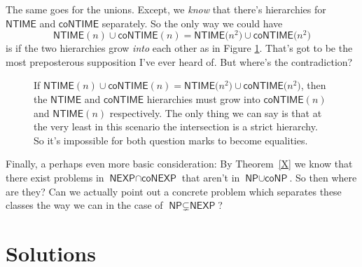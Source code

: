\documentclass{article}
\theoremstyle{customstyle}
\newcommand{\NTIME}{\ensuremath{\textsf{NTIME}}}
\newcommand{\coNTIME}{\ensuremath{\textsf{coNTIME}}}
\newcommand{\NP}{\ensuremath{\textsf{NP}}}
\newcommand{\NEXP}{\ensuremath{\textsf{NEXP}}}
\newcommand{\interEXP}{\ensuremath{\textsf{NEXP}\cap\textsf{coNEXP}}}
\newcommand{\unionP}{\ensuremath{\textsf{NP}\cup\textsf{coNP}}}
\begin{document}
The same goes for the unions. Except, we \textit{know} that there's hierarchies for $\NTIME$ and $\coNTIME$ separately. So the only way we could have
\[
\NTIME(n) \cup \coNTIME(n) = \NTIME\bigl(n^2\bigr) \cup \coNTIME\bigl(n^2\bigr)
\]
is if the two hierarchies grow \textit{into} each other as in Figure \ref{fig:unions-equal}. That's got to be the most preposterous supposition I've ever heard of. But where's the contradiction?

\begin{figure}
\centering
{}
\caption{If $\NTIME(n) \cup \coNTIME(n) = \NTIME\bigl(n^2\bigr) \cup \coNTIME\bigl(n^2\bigr)$, then the $\NTIME$ and $\coNTIME$ hierarchies must grow into $\coNTIME(n)$ and $\NTIME(n)$ respectively. The only thing we can say is that at the very least in this scenario the intersection is a strict hierarchy. So it's impossible for both question marks to become equalities.}
\label{fig:unions-equal}
\end{figure}

Finally, a perhaps even more basic consideration: By Theorem~\ref{X} we know that there exist problems in $\interEXP$ that aren't in $\unionP$. So then where are they? Can we actually point out a concrete problem which separates these classes the way we can in the case of $\NP \subsetneq \NEXP$?

\section*{Solutions}
\end{document}
